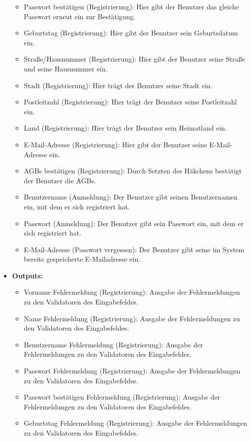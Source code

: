 \begin{itemize}
\begin{itemize}
							\item Passwort bestätigen (Registrierung): Hier gibt der Benutzer das gleiche Passwort erneut ein zur Bestätigung.
							\item Geburtstag (Registrierung): Hier gibt der Benutzer sein Geburtsdatum ein.
							\item Straße/Hausnummer (Registrierung): Hier gibt der Benutzer seine Straße und seine Hausnummer ein.
							\item Stadt (Registrierung): Hier trägt der Benutzer seine Stadt ein.
							\item Postleitzahl (Registrierung): Hier trägt der Benutzer seine Postleitzahl ein.
							\item Land (Registrierung): Hier trägt der Benutzer sein Heimatland ein.
							\item E-Mail-Adresse (Registrierung): Hier gibt der Benutzer seine E-Mail-Adresse ein.
							\item AGBs bestätigen (Registrierung): Durch Setzten des Häkchens bestätigt der Benutzer die AGBs. 
							\item Benutzername (Anmeldung): Der Benutzer gibt seinen Benutzernamen ein, mit dem er sich registriert hat.
							\item Passwort (Anmeldung): Der Benutzer gibt sein Passwort ein, mit dem er sich registriert hat.
							\item E-Mail-Adresse (Passwort vergessen): Der Benutzer gibt seine im System bereits gespeicherte E-Mailadresse ein.
						\end{itemize}
					\item \textbf{Outputs:} 
						\begin{itemize}
							\item Vorname Fehlermeldung (Registrierung): Ausgabe der Fehlermeldungen zu den Validatoren des Eingabefeldes.
							\item Name Fehlermeldung (Registrierung): Ausgabe der Fehlermeldungen zu den Validatoren des Eingabefeldes.
							\item Benutzername Fehlermeldung (Registrierung): Ausgabe der Fehlermeldungen zu den Validatoren des Eingabefeldes.
							\item Passwort Fehlermeldung (Registrierung): Ausgabe der Fehlermeldungen zu den Validatoren des Eingabefeldes.
							\item Passwort bestätigen Fehlermeldung (Registrierung): Ausgabe der Fehlermeldungen zu den Validatoren des Eingabefeldes.
							\item Geburtstag Fehlermeldung (Registrierung): Ausgabe der Fehlermeldungen zu den Validatoren des Eingabefeldes.

\end{itemize}
\end{itemize}
